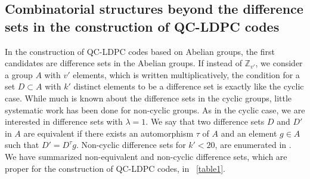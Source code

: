 \documentclass[journal,draftclsnofoot,onecolumn,12pt,twoside]{IEEEtran}
\begin{document}
\subsection{Combinatorial structures beyond the difference sets in the construction of QC-LDPC codes}
In the construction of QC-LDPC codes based on Abelian groups, the first candidates  are difference sets in the Abelian groups. If instead of $\mathbb{Z}_{v'}$, we consider a group $A$ with $v'$ elements, which is written multiplicatively, the condition for a set $D\subset A$ with $k'$ distinct elements to be a difference set is exactly like the cyclic case. While much is known about the difference sets in the cyclic groups, little systematic work has been done for non-cyclic groups. As in the cyclic case, we are interested in difference sets with $\lambda=1$. We say that two difference sets $D$ and $D'$ in $A$ are equivalent if there exists an automorphism $\tau$ of
$A$ and an element $g\in  A$ such that $D' = D^{\tau}g$.   Non-cyclic difference sets for $k' < 20$, are enumerated in \cite{22}. We have summarized non-equivalent and  non-cyclic difference sets, which are proper for the construction of QC-LDPC codes, in \tablename~\ref{table1}.
\end{document}
